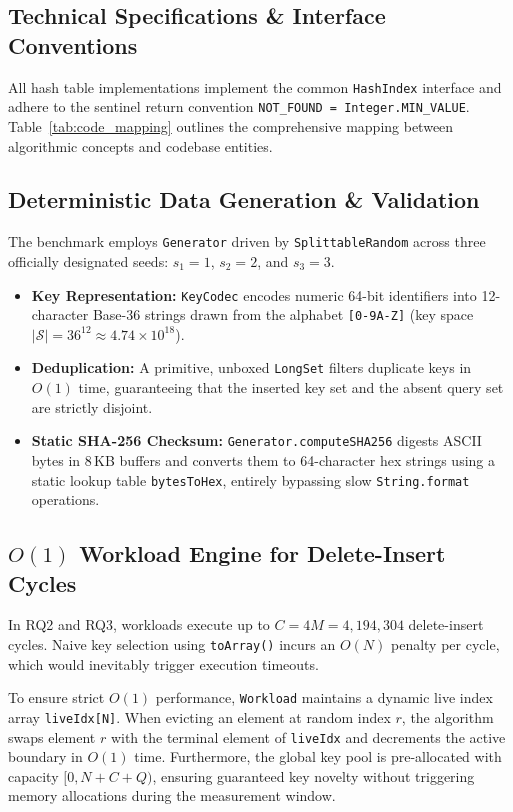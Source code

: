 \documentclass[twocolumn, 10pt, a4paper]{article}
\begin{document}
\subsection{Technical Specifications \& Interface Conventions}
All hash table implementations implement the common \texttt{HashIndex} interface and adhere to the sentinel return convention \texttt{NOT\_FOUND = Integer.MIN\_VALUE}. Table~\ref{tab:code_mapping} outlines the comprehensive mapping between algorithmic concepts and codebase entities.

\subsection{Deterministic Data Generation \& Validation}
The benchmark employs \texttt{Generator} driven by \texttt{SplittableRandom} across three officially designated seeds: $s_1 = 1$, $s_2 = 2$, and $s_3 = 3$.
\begin{itemize}
    \item \textbf{Key Representation:} \texttt{KeyCodec} encodes numeric 64-bit identifiers into 12-character Base-36 strings drawn from the alphabet \texttt{[0-9A-Z]} (key space $|\mathcal{S}| = 36^{12} \approx 4.74 \times 10^{18}$).
    \item \textbf{Deduplication:} A primitive, unboxed \texttt{LongSet} filters duplicate keys in $O(1)$ time, guaranteeing that the inserted key set and the absent query set are strictly disjoint.
    \item \textbf{Static SHA-256 Checksum:} \texttt{Generator.computeSHA256} digests ASCII bytes in 8\,KB buffers and converts them to 64-character hex strings using a static lookup table \texttt{bytesToHex}, entirely bypassing slow \texttt{String.format} operations.
\end{itemize}

\subsection{$O(1)$ Workload Engine for Delete-Insert Cycles}
In RQ2 and RQ3, workloads execute up to $C = 4M = 4,194,304$ delete-insert cycles. Naive key selection using \texttt{toArray()} incurs an $O(N)$ penalty per cycle, which would inevitably trigger execution timeouts.

To ensure strict $O(1)$ performance, \texttt{Workload} maintains a dynamic live index array \texttt{liveIdx[N]}. When evicting an element at random index $r$, the algorithm swaps element $r$ with the terminal element of \texttt{liveIdx} and decrements the active boundary in $O(1)$ time. Furthermore, the global key pool is pre-allocated with capacity $[0, N + C + Q)$, ensuring guaranteed key novelty without triggering memory allocations during the measurement window.
\end{document}
